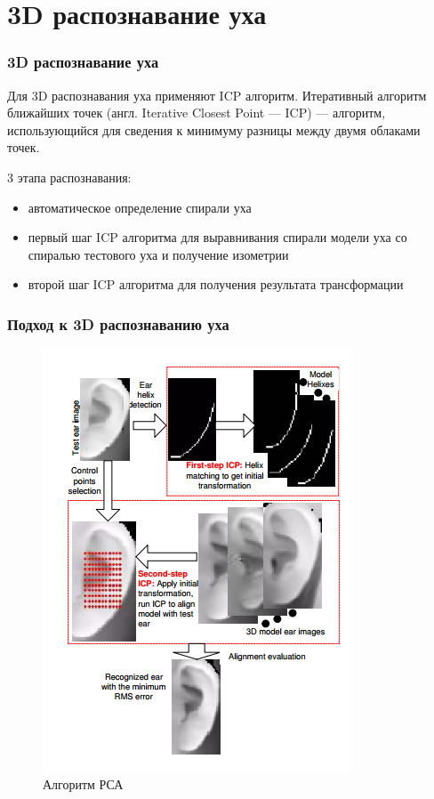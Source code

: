 \documentclass{beamer}
\begin{document}
\section{3D распознавание уха}

\begin{frame}
\frametitle{3D распознавание уха}

Для 3D распознавания уха применяют ICP алгоритм. Итеративный алгоритм ближайших точек (англ. Iterative Closest Point — ICP) — алгоритм, использующийся для сведения к минимуму разницы между двумя облаками точек.

3 этапа распознавания:
\begin{itemize}
\item автоматическое определение спирали уха
\item первый шаг ICP алгоритма для выравнивания спирали модели уха со спиралью тестового уха и получение изометрии
\item второй шаг ICP алгоритма для получения результата трансформации
\end{itemize}

\end{frame}

\begin{frame}
\frametitle{Подход к 3D распознаванию уха}

\begin{figure}[h!]
\centering
\includegraphics[scale=0.60]{res/icp_steps}
\caption{Алгоритм РСА}
\end{figure}

\end{frame}
\end{document}
